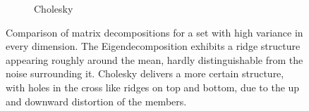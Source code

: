 \begin{figure}
\begin{subfigure}[b]{0.49\textwidth}
        \caption{Cholesky}
        \label{fig:HUCchol}
    \end{subfigure}
    \caption{Comparison of matrix decompositions for a set with high
    variance in every dimension. The Eigendecomposition exhibits a ridge
    structure appearing roughly around the mean, hardly distinguishable 
    from the noise surrounding it. Cholesky delivers a more certain
    structure, with holes in the cross like ridges on top and bottom,
    due to the up and downward distortion of the members.}
    \label{fig:HUCcomp}
\end{figure}
